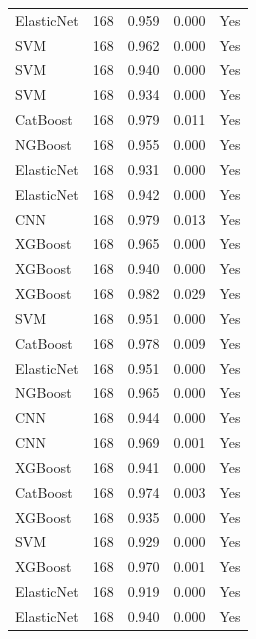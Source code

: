 \begin{table}
\begin{tabular}{lrrrr}
ElasticNet & 168 &        0.959 &     0.000 &                Yes \\
       SVM & 168 &        0.962 &     0.000 &                Yes \\
       SVM & 168 &        0.940 &     0.000 &                Yes \\
       SVM & 168 &        0.934 &     0.000 &                Yes \\
  CatBoost & 168 &        0.979 &     0.011 &                Yes \\
   NGBoost & 168 &        0.955 &     0.000 &                Yes \\
ElasticNet & 168 &        0.931 &     0.000 &                Yes \\
ElasticNet & 168 &        0.942 &     0.000 &                Yes \\
       CNN & 168 &        0.979 &     0.013 &                Yes \\
   XGBoost & 168 &        0.965 &     0.000 &                Yes \\
   XGBoost & 168 &        0.940 &     0.000 &                Yes \\
   XGBoost & 168 &        0.982 &     0.029 &                Yes \\
       SVM & 168 &        0.951 &     0.000 &                Yes \\
  CatBoost & 168 &        0.978 &     0.009 &                Yes \\
ElasticNet & 168 &        0.951 &     0.000 &                Yes \\
   NGBoost & 168 &        0.965 &     0.000 &                Yes \\
       CNN & 168 &        0.944 &     0.000 &                Yes \\
       CNN & 168 &        0.969 &     0.001 &                Yes \\
   XGBoost & 168 &        0.941 &     0.000 &                Yes \\
  CatBoost & 168 &        0.974 &     0.003 &                Yes \\
   XGBoost & 168 &        0.935 &     0.000 &                Yes \\
       SVM & 168 &        0.929 &     0.000 &                Yes \\
   XGBoost & 168 &        0.970 &     0.001 &                Yes \\
ElasticNet & 168 &        0.919 &     0.000 &                Yes \\
ElasticNet & 168 &        0.940 &     0.000 &                Yes \\

\end{tabular}
\end{table}
